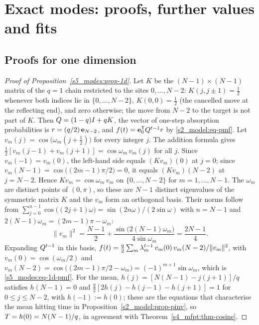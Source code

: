 \section{Exact modes: proofs, further values and fits}\label{sup_modes:sec}

\subsection{Proofs for one dimension}\label{sup_modes:ssec-1d-proofs}

\begin{proof}[Proof of Proposition~\ref{s5_modes:prop-1d}]
Let $K$ be the $(N-1)\times(N-1)$ matrix of the $q=1$ chain restricted to the sites $0,\dots,N-2$:
$K(j,j\pm1)=\tfrac12$ whenever both indices lie in $\{0,\dots,N-2\}$, $K(0,0)=\tfrac12$ (the cancelled move at the
reflecting end), and zero otherwise; the move from $N-2$ to the target is not part of $K$. Then $Q=(1-q)I+qK$,
the vector of one-step absorption probabilities is $r=(q/2)\,\mathbf{e}_{N-2}$, and $f(t)=\mathbf{e}_{0}^{\mathsf{T}}Q^{t-1}r$ by
\eqref{s2_model:eq-pmf}. Let $v_m(j)=\cos\bigl(\omega_m(j+\tfrac12)\bigr)$ for every integer $j$. The addition
formula gives $\tfrac12[v_m(j-1)+v_m(j+1)]=\cos\omega_m\,v_m(j)$ for all $j$. Since $v_m(-1)=v_m(0)$, the left-hand
side equals $(Kv_m)(0)$ at $j=0$; since $v_m(N-1)=\cos\bigl((2m-1)\pi/2\bigr)=0$, it equals $(Kv_m)(N-2)$ at
$j=N-2$. Hence $Kv_m=\cos\omega_m\,v_m$ on $\{0,\dots,N-2\}$ for $m=1,\dots,N-1$. The $\omega_m$ are distinct
points of $(0,\pi)$, so these are $N-1$ distinct eigenvalues of the symmetric matrix $K$ and the $v_m$ form an
orthogonal basis. Their norms follow from $\sum_{j=0}^{n-1}\cos\bigl((2j+1)\omega\bigr)=\sin(2n\omega)/(2\sin\omega)$
with $n=N-1$ and $2(N-1)\omega_m=(2m-1)\pi-\omega_m$:
\[
  \|v_m\|^{2}=\frac{N-1}{2}+\frac{\sin\bigl(2(N-1)\omega_m\bigr)}{4\sin\omega_m}=\frac{2N-1}{4}.
\]
Expanding $Q^{t-1}$ in this basis,
$f(t)=\frac q2\sum_m\lambda_m^{t-1}\,v_m(0)\,v_m(N-2)/\|v_m\|^{2}$, with $v_m(0)=\cos(\omega_m/2)$ and
$v_m(N-2)=\cos\bigl((2m-1)\pi/2-\omega_m\bigr)=(-1)^{m+1}\sin\omega_m$, which is \eqref{s5_modes:eq-1d-pmf}.
For the mean, $h(j)=[N(N-1)-j(j+1)]/q$ satisfies $h(N-1)=0$ and
$\tfrac q2[2h(j)-h(j-1)-h(j+1)]=1$ for $0\le j\le N-2$, with $h(-1):=h(0)$; these are the equations that
characterise the mean hitting time in Proposition~\ref{s2_model:prop-pinv}, so $T=h(0)=N(N-1)/q$, in agreement
with Theorem~\ref{s4_mfpt:thm-cosine}.
\end{proof}

